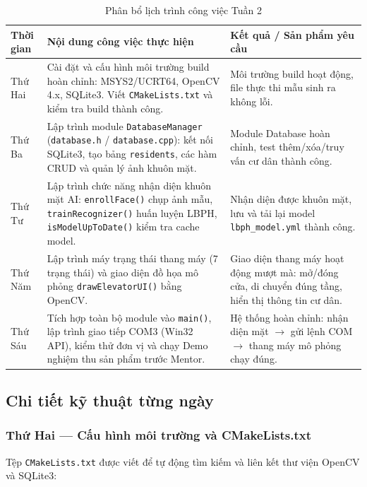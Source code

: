 \documentclass[12pt,a4paper]{article}
\begin{document}
\begin{table}[h!]
\centering
\caption{Phân bổ lịch trình công việc Tuần 2}
\renewcommand{\arraystretch}{1.4}
\begin{tabular}{|m{2cm}|m{8cm}|m{4.5cm}|}
\hline
\textbf{Thời gian} & \textbf{Nội dung công việc thực hiện} & \textbf{Kết quả / Sản phẩm yêu cầu} \\ \hline
Thứ Hai &
Cài đặt và cấu hình môi trường build hoàn chỉnh: MSYS2/UCRT64, OpenCV 4.x, SQLite3. Viết \texttt{CMakeLists.txt} và kiểm tra build thành công. &
Môi trường build hoạt động, file thực thi mẫu sinh ra không lỗi. \\ \hline
Thứ Ba &
Lập trình module \texttt{DatabaseManager} (\texttt{database.h} / \texttt{database.cpp}): kết nối SQLite3, tạo bảng \texttt{residents}, các hàm CRUD và quản lý ảnh khuôn mặt. &
Module Database hoàn chỉnh, test thêm/xóa/truy vấn cư dân thành công. \\ \hline
Thứ Tư &
Lập trình chức năng nhận diện khuôn mặt AI: \texttt{enrollFace()} chụp ảnh mẫu, \texttt{trainRecognizer()} huấn luyện LBPH, \texttt{isModelUpToDate()} kiểm tra cache model. &
Nhận diện được khuôn mặt, lưu và tải lại model \texttt{lbph\_model.yml} thành công. \\ \hline
Thứ Năm &
Lập trình máy trạng thái thang máy (7 trạng thái) và giao diện đồ họa mô phỏng \texttt{drawElevatorUI()} bằng OpenCV. &
Giao diện thang máy hoạt động mượt mà: mở/đóng cửa, di chuyển đúng tầng, hiển thị thông tin cư dân. \\ \hline
Thứ Sáu &
Tích hợp toàn bộ module vào \texttt{main()}, lập trình giao tiếp COM3 (Win32 API), kiểm thử đơn vị và chạy Demo nghiệm thu sản phẩm trước Mentor. &
Hệ thống hoàn chỉnh: nhận diện mặt $\rightarrow$ gửi lệnh COM $\rightarrow$ thang máy mô phỏng chạy đúng. \\ \hline
\end{tabular}
\end{table}

\subsection{Chi tiết kỹ thuật từng ngày}

\subsubsection{Thứ Hai --- Cấu hình môi trường và CMakeLists.txt}

Tệp \texttt{CMakeLists.txt} được viết để tự động tìm kiếm và liên kết thư viện OpenCV và SQLite3:
\end{document}

